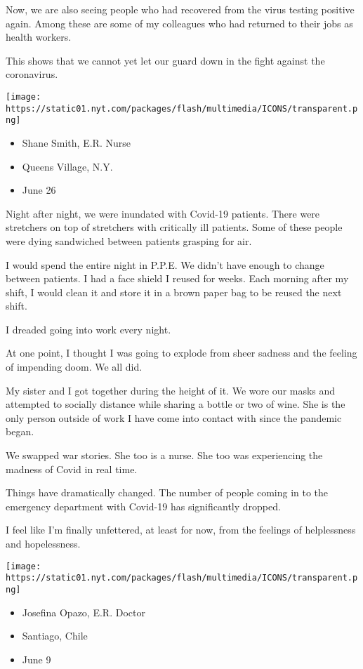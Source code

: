 Now, we are also seeing people who had recovered from the virus testing
positive again. Among these are some of my colleagues who had returned
to their jobs as health workers.

This shows that we cannot yet let our guard down in the fight against
the coronavirus.

\texttt{[image: https://static01.nyt.com/packages/flash/multimedia/ICONS/transparent.png]}

\begin{itemize}
\tightlist
\item
  Shane Smith, E.R. Nurse
\item
  Queens Village, N.Y.
\item
  June 26
\end{itemize}

Night after night, we were inundated with Covid-19 patients. There were
stretchers on top of stretchers with critically ill patients. Some of
these people were dying sandwiched between patients grasping for air.

I would spend the entire night in P.P.E. We didn't have enough to change
between patients. I had a face shield I reused for weeks. Each morning
after my shift, I would clean it and store it in a brown paper bag to be
reused the next shift.

I dreaded going into work every night.

At one point, I thought I was going to explode from sheer sadness and
the feeling of impending doom. We all did.

My sister and I got together during the height of it. We wore our masks
and attempted to socially distance while sharing a bottle or two of
wine. She is the only person outside of work I have come into contact
with since the pandemic began.

We swapped war stories. She too is a nurse. She too was experiencing the
madness of Covid in real time.

Things have dramatically changed. The number of people coming in to the
emergency department with Covid-19 has significantly dropped.

I feel like I'm finally unfettered, at least for now, from the feelings
of helplessness and hopelessness.

\texttt{[image: https://static01.nyt.com/packages/flash/multimedia/ICONS/transparent.png]}

\begin{itemize}
\tightlist
\item
  Josefina Opazo, E.R. Doctor
\item
  Santiago, Chile
\item
  June 9
\end{itemize}


